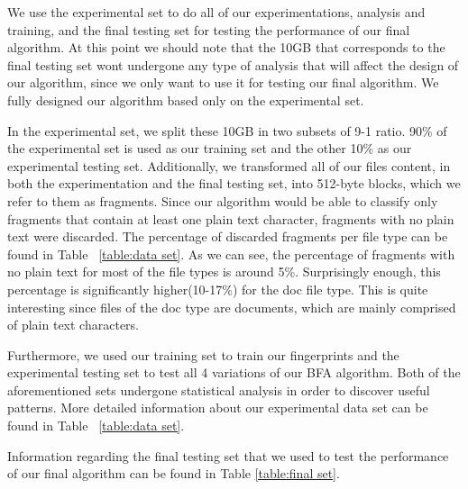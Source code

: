 We use the experimental set to do all of our experimentations, analysis and training,  and the final testing set for testing the performance of our final algorithm.
At this point we should note that the 10GB that corresponds to the final testing set wont undergone any type of analysis that will affect the design of our algorithm, since we only want to use it for testing our final algorithm. We fully designed our algorithm based only on the experimental set.

In the experimental set, we split these 10GB in two subsets of 9-1 ratio.  90\% of the experimental set is used as our training set and the other 10\% as our experimental testing set. Additionally, we transformed all of our files content, in both the experimentation and the final testing set, into 512-byte blocks, which we refer to them as fragments. Since our algorithm would be able to classify only fragments that contain at least one plain text character, fragments with no plain text were discarded. The percentage of discarded fragments per file type can be found in Table ~\ref{table:data set}. As we can see, the percentage of fragments with no plain text for most of the file types is around 5\%. Surprisingly enough, this percentage is significantly higher(10-17\%) for the doc file type. This is quite interesting since files of the doc type are documents, which are mainly comprised of plain text characters.

Furthermore, we used our training set to train our fingerprints and the experimental testing set to test all 4 variations of our BFA algorithm. Both of the aforementioned sets undergone statistical analysis in order to discover useful patterns. More detailed information about our experimental data set can be found in Table ~\ref{table:data set}.


Information regarding the final testing set that we used to test the performance of our final algorithm can be found in Table \ref{table:final set}.









